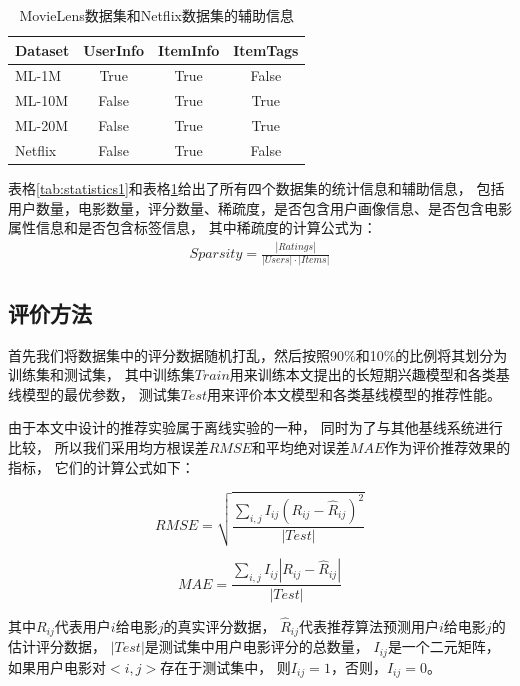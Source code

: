 \begin{table}[htbp]
    \centering
    \caption{MovieLens数据集和Netflix数据集的辅助信息}
    \label{tab:statistics2}
        \begin{tabular}{|l|c|c|c|}
        \hline
        \textbf{Dataset} & \textbf{UserInfo} & \textbf{ItemInfo} & \textbf{ItemTags} \\
        \hline
        ML-1M   & True  & True & False \\
        ML-10M  & False & True & True  \\
        ML-20M  & False & True & True  \\
        Netflix & False & True & False \\
        \hline
    \end{tabular}
\end{table}

表格\ref{tab:statistics1}和表格\ref{tab:statistics2}给出了所有四个数据集的统计信息和辅助信息，
包括用户数量，电影数量，评分数量、稀疏度，是否包含用户画像信息、是否包含电影属性信息和是否包含标签信息，
其中稀疏度的计算公式为：
\begin{equation}
\begin{split}
Sparsity = \frac{|Ratings|}{|Users| \cdot |Items|}
\end{split}
\end{equation}

\subsection{评价方法}
首先我们将数据集中的评分数据随机打乱，然后按照90\%和10\%的比例将其划分为训练集和测试集，
其中训练集$Train$用来训练本文提出的长短期兴趣模型和各类基线模型的最优参数，
测试集$Test$用来评价本文模型和各类基线模型的推荐性能。

由于本文中设计的推荐实验属于离线实验的一种，
同时为了与其他基线系统进行比较，
所以我们采用均方根误差$RMSE$和平均绝对误差$MAE$作为评价推荐效果的指标，
它们的计算公式如下：

\begin{equation}
RMSE = \sqrt{ \frac{\sum_{i,j} I_{ij} (R_{ij} - \hat{R}_{ij})^2 } {|Test|} }
\end{equation}

\begin{equation}
MAE = \frac{\sum_{i,j} I_{ij} |R_{ij} - \hat{R}_{ij}|}{|Test|}
\end{equation}

其中$R_{ij}$代表用户$i$给电影$j$的真实评分数据，
$\hat{R}_{ij}$代表推荐算法预测用户$i$给电影$j$的估计评分数据，
$|Test|$是测试集中用户电影评分的总数量，
$I_{ij}$是一个二元矩阵，如果用户电影对$<i, j>$存在于测试集中，
则$I_{ij} = 1$，否则，$I_{ij} = 0$。

